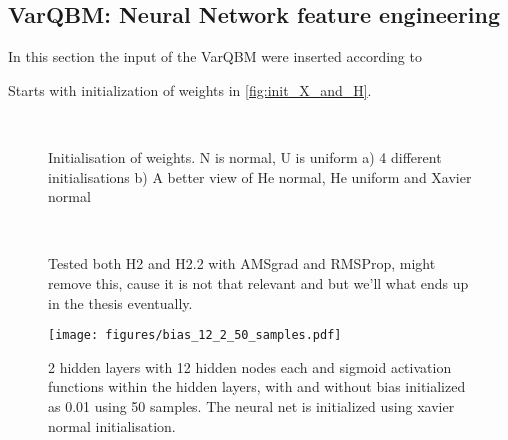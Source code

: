 \documentclass[../main.tex]{subfiles}
\begin{document}
\subsection{VarQBM: Neural Network feature engineering}
In this section the input of the VarQBM were inserted according to 

Starts with initialization of weights in \autoref{fig:init_X_and_H}.

\begin{figure}%
    \centering
    \\
    \caption{Initialisation of weights. N is normal, U is uniform a) 4 different initialisations b) A better view of He normal, He uniform and Xavier normal}%
    \label{fig:init_X_and_He}%
\end{figure}

\begin{comment}
\begin{figure}
\centering
\begin{subfigure}[\centering]
   \texttt{[image: figures/loss\_train12\_2\_sig\_initialisationhhall.pdf]}
   \caption{}
  \end{subfigure}
\begin{subfigure}[\centering]
   \texttt{[image: figures/loss\_train12\_2\_sig\_initialisationhh3.pdf]}
   \caption{}
\end{subfigure}
\caption{Le caption}
\end{figure}
\end{comment}

\begin{figure}%
    \centering
    \\
    \caption{Tested both H2 and H2.2 with AMSgrad and RMSProp, might remove this, cause it is not that relevant and but we'll what ends up in the thesis eventually.}%
    \label{fig:lr_exp}%
\end{figure}

\begin{figure}
    \begin{center}
        \texttt{[image: figures/bias\_12\_2\_50\_samples.pdf]}
        \caption{2 hidden layers with 12 hidden nodes each and sigmoid activation functions within the hidden layers, with and without bias initialized as 0.01 using 50 samples. The neural net is initialized using xavier normal initialisation.}
        \label{fig:4}
    \end{center}
\end{figure}
\end{document}

